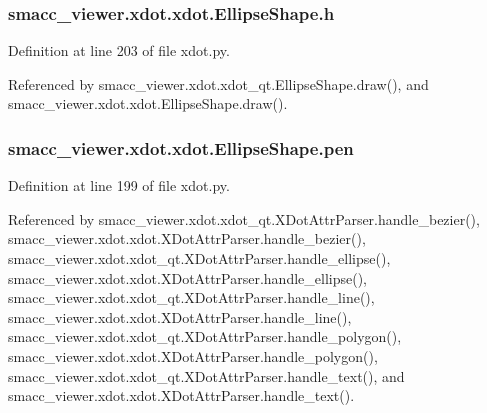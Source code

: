 \subsubsection[{\texorpdfstring{h}{h}}]{\setlength{\rightskip}{0pt plus 5cm}smacc\+\_\+viewer.\+xdot.\+xdot.\+Ellipse\+Shape.\+h}\hypertarget{classsmacc__viewer_1_1xdot_1_1xdot_1_1EllipseShape_a2f7ac4a36e7a9a76cd8458a001dede67}{}\label{classsmacc__viewer_1_1xdot_1_1xdot_1_1EllipseShape_a2f7ac4a36e7a9a76cd8458a001dede67}


Definition at line 203 of file xdot.\+py.



Referenced by smacc\+\_\+viewer.\+xdot.\+xdot\+\_\+qt.\+Ellipse\+Shape.\+draw(), and smacc\+\_\+viewer.\+xdot.\+xdot.\+Ellipse\+Shape.\+draw().

\subsubsection[{\texorpdfstring{pen}{pen}}]{\setlength{\rightskip}{0pt plus 5cm}smacc\+\_\+viewer.\+xdot.\+xdot.\+Ellipse\+Shape.\+pen}\hypertarget{classsmacc__viewer_1_1xdot_1_1xdot_1_1EllipseShape_a4d04a594c784a4364ba27d247b47a951}{}\label{classsmacc__viewer_1_1xdot_1_1xdot_1_1EllipseShape_a4d04a594c784a4364ba27d247b47a951}


Definition at line 199 of file xdot.\+py.



Referenced by smacc\+\_\+viewer.\+xdot.\+xdot\+\_\+qt.\+X\+Dot\+Attr\+Parser.\+handle\+\_\+bezier(), smacc\+\_\+viewer.\+xdot.\+xdot.\+X\+Dot\+Attr\+Parser.\+handle\+\_\+bezier(), smacc\+\_\+viewer.\+xdot.\+xdot\+\_\+qt.\+X\+Dot\+Attr\+Parser.\+handle\+\_\+ellipse(), smacc\+\_\+viewer.\+xdot.\+xdot.\+X\+Dot\+Attr\+Parser.\+handle\+\_\+ellipse(), smacc\+\_\+viewer.\+xdot.\+xdot\+\_\+qt.\+X\+Dot\+Attr\+Parser.\+handle\+\_\+line(), smacc\+\_\+viewer.\+xdot.\+xdot.\+X\+Dot\+Attr\+Parser.\+handle\+\_\+line(), smacc\+\_\+viewer.\+xdot.\+xdot\+\_\+qt.\+X\+Dot\+Attr\+Parser.\+handle\+\_\+polygon(), smacc\+\_\+viewer.\+xdot.\+xdot.\+X\+Dot\+Attr\+Parser.\+handle\+\_\+polygon(), smacc\+\_\+viewer.\+xdot.\+xdot\+\_\+qt.\+X\+Dot\+Attr\+Parser.\+handle\+\_\+text(), and smacc\+\_\+viewer.\+xdot.\+xdot.\+X\+Dot\+Attr\+Parser.\+handle\+\_\+text().

